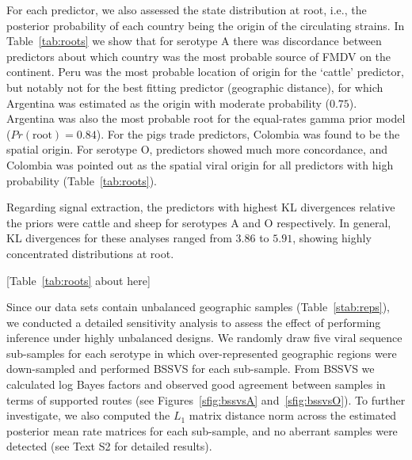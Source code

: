 \documentclass[10pt]{article}
\begin{document}
For each predictor, we also assessed the state distribution at root, i.e., the posterior probability of each country being the origin of the circulating strains.
In Table~\ref{tab:roots} we show that for serotype A there was discordance between predictors about which country was the most probable source of FMDV on the continent.
Peru was the most probable location of origin for the `cattle' predictor, but notably not for the best fitting predictor (geographic distance), for which Argentina was estimated as the origin with moderate probability ($0.75$).
Argentina was also the most probable root for the equal-rates gamma prior model ($Pr(\text{root})=0.84$).
For the pigs trade predictors, Colombia was found to be the spatial origin.
For serotype O, predictors showed much more concordance, and Colombia was pointed out as the spatial viral origin for all predictors with high probability (Table~\ref{tab:roots}).

Regarding signal extraction, the predictors with highest KL divergences relative the priors were cattle and sheep for serotypes A and O respectively.
In general, KL divergences for these analyses ranged from $3.86$ to $5.91$, showing highly concentrated distributions at root. 

\begin{center}
 [Table~\ref{tab:roots} about here]
\end{center}

Since our data sets contain unbalanced geographic samples (Table~\ref{stab:reps}), we conducted a detailed sensitivity analysis to assess the effect of performing inference under highly unbalanced designs.
We randomly draw five viral sequence sub-samples for each serotype in which over-represented geographic regions were down-sampled and performed BSSVS for each sub-sample.
From BSSVS we calculated log Bayes factors and observed good agreement between samples in terms of supported routes (see Figures~\ref{sfig:bssvsA} and~\ref{sfig:bssvsO}).
To further investigate, we also computed the $L_1$ matrix distance norm across the estimated posterior mean rate matrices for each sub-sample, and no aberrant samples were detected (see Text S2 for detailed results).
\end{document}
